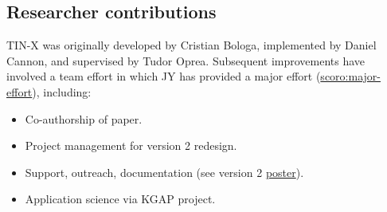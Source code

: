 \subsection{Researcher contributions}

TIN-X was originally developed by Cristian Bologa, implemented by Daniel Cannon, and supervised by Tudor Oprea. Subsequent improvements have involved a team effort in which JY has provided a major effort (\href{http://purl.org/spar/scoro/major-effort}{scoro:major-effort}), including:

\begin{itemize}[topsep=0pt,itemsep=0pt,partopsep=0pt,parsep=0pt]
    \item Co-authorship of paper.
    \item Project management for version 2 redesign.
    \item Support, outreach, documentation (see version 2 \href{https://zenodo.org/record/5038628}{poster}).
    \item Application science via KGAP project.
\end{itemize}
